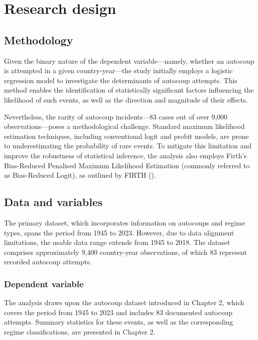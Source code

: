\documentclass[
  12pt,
]{report}
\begin{document}
\section{Research design}\label{research-design}

\subsection*{Methodology}\label{methodology}

Given the binary nature of the dependent variable---namely, whether an
autocoup is attempted in a given country-year---the study initially
employs a logistic regression model to investigate the determinants of
autocoup attempts. This method enables the identification of
statistically significant factors influencing the likelihood of such
events, as well as the direction and magnitude of their effects.

Nevertheless, the rarity of autocoup incidents---83 cases out of over
9,000 observations---poses a methodological challenge. Standard maximum
likelihood estimation techniques, including conventional logit and
probit models, are prone to underestimating the probability of rare
events. To mitigate this limitation and improve the robustness of
statistical inference, the analysis also employs Firth's Bias-Reduced
Penalised Maximum Likelihood Estimation (commonly referred to as
Bias-Reduced Logit), as outlined by FIRTH
().

\subsection*{Data and variables}\label{data-and-variables}

The primary dataset, which incorporates information on autocoups and
regime types, spans the period from 1945 to 2023. However, due to data
alignment limitations, the usable data range extends from 1945 to 2018.
The dataset comprises approximately 9,400 country-year observations, of
which 83 represent recorded autocoup attempts.

\subsubsection*{Dependent variable}\label{dependent-variable}

The analysis draws upon the autocoup dataset introduced in Chapter 2,
which covers the period from 1945 to 2023 and includes 83 documented
autocoup attempts. Summary statistics for these events, as well as the
corresponding regime classifications, are presented in Chapter 2.
\end{document}
